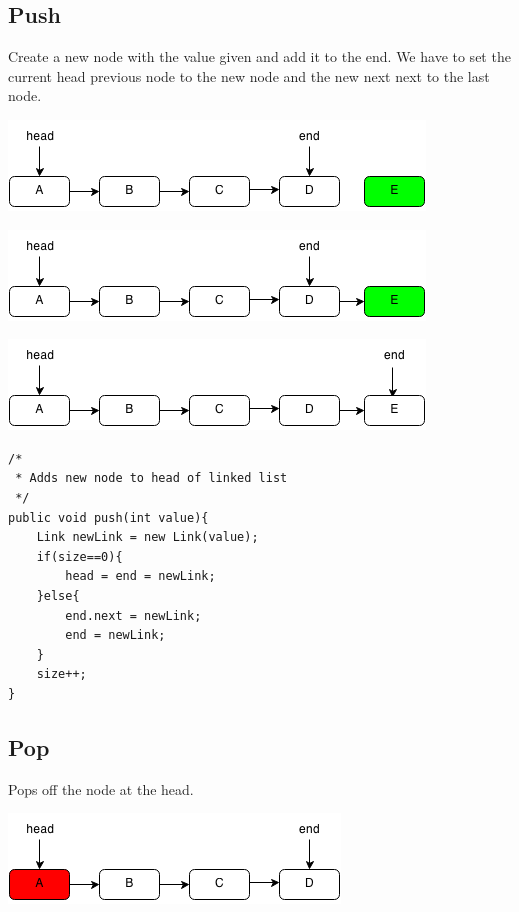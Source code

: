 \documentclass[11pt,oneside]{book}
\makeatletter
\def\maxwidth#1{\ifdim\Gin@nat@width>#1 #1\else\Gin@nat@width\fi}
\makeatother
\begin{document}
\subsection{Push}

Create a new node with the value given and add it to the end. We have to set the current head previous node to the new node and the new next next to the last node.

\vspace{5px}\includegraphics[width=\maxwidth{\textwidth}]{linkedlistpush.png}

\vspace{5px}\includegraphics[width=\maxwidth{\textwidth}]{linkedlistpush2.png}

\vspace{5px}\includegraphics[width=\maxwidth{\textwidth}]{linkedlistpush3.png}

\begin{lstlisting}
/*
 * Adds new node to head of linked list
 */
public void push(int value){
    Link newLink = new Link(value);
    if(size==0){
        head = end = newLink;
    }else{
        end.next = newLink;
        end = newLink;
    }
    size++;
}
\end{lstlisting}

\subsection{Pop}

Pops off the node at the head.

\vspace{5px}\includegraphics[width=\maxwidth{\textwidth}]{linkedlistpop.png}
\end{document}
